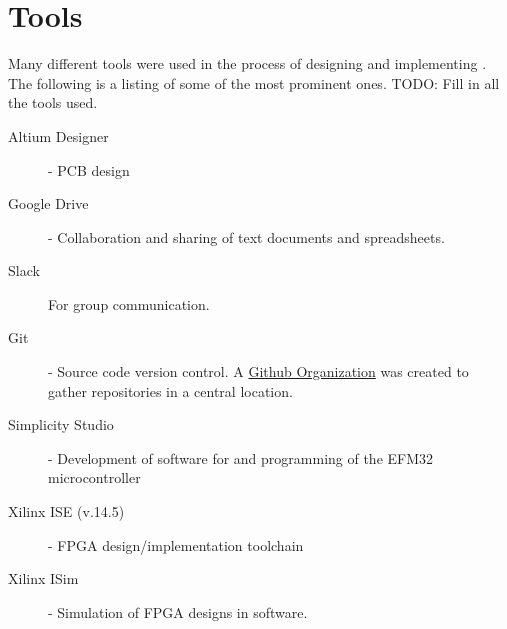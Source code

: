 \chapter{Tools}

Many different tools were used in the process of designing and implementing \vthreek.
The following is a listing of some of the most prominent ones.
TODO: Fill in all the tools used.

\begin{description}
    \item[Altium Designer] - PCB design
    \item[Google Drive] - Collaboration and sharing of text documents and spreadsheets.
    \item[Slack] For group communication.
    \item[Git] - Source code version control. A \href{https://github.com/DMPRO-2015-vector-graphics}{Github Organization} was created to gather repositories in a central location.
    \item[Simplicity Studio] - Development of software for and programming of the EFM32 microcontroller
    \item[Xilinx ISE (v.14.5)] - FPGA design/implementation toolchain
    \item[Xilinx ISim] - Simulation of FPGA designs in software.
\end{description}
